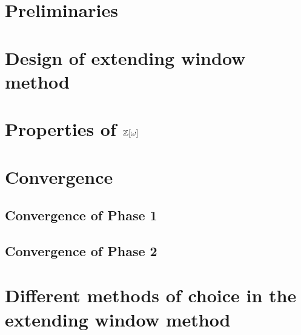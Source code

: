 \documentclass[11pt,a4paper]{report}	%
\theoremstyle{definition}
\begin{document}
\tableofcontents



\chapter{Preliminaries}
	




\chapter{Design of extending window method}
\label{chap:ewm}
	

\chapter{\texorpdfstring{Properties of $\mathbb{Z}[\omega]$}{Properties of Z[omega]}}
	
	
		
	
\chapter{Convergence}
\label{chap:convergence}

	\section{Convergence of Phase 1}
	

	\section{Convergence of Phase 2}
	
	

	


\chapter{Different methods of choice in the extending window method}
	\label{chap:diffChoices}

	

	

	
	
\end{document}
